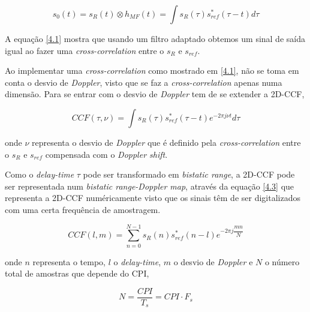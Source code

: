 \begin{equation} \label{4.1}
s_{0}\left( t\right) =s_{R}\left( t\right)\otimes h_{MF}\left( t\right) =\int s_{R}\left( \tau\right)s_{ref}^{\ast}\left(\tau -t\right)d\tau
\end{equation}

A equação \ref{4.1} mostra que usando um filtro adaptado obtemos um sinal de saída igual ao fazer uma \textit{cross-correlation} entre o $s_{R}$ e $s_{ref}$.\par 

Ao implementar uma \textit{cross-correlation} como mostrado em \ref{4.1}, não se toma em conta o desvio de \textit{Doppler}, visto que se faz a \textit{cross-correlation} apenas numa dimensão. Para se entrar com o desvio de \textit{Doppler} tem de se extender a \gls{2D-CCF},

\begin{equation} \label{4.2}
CCF\left( \tau,\nu\right) =\int s_{R}\left( \tau\right)s_{ref}^{\ast}\left(\tau -t\right)e^{-2\pi j\nu t}d\tau
\end{equation}

onde $\nu$ representa o desvio de \textit{Doppler} que é definido pela \textit{cross-correlation} entre o $s_{R}$ e $s_{ref}$ compensada com o \textit{Doppler shift}.\par
Como o \textit{delay-time} $\tau$ pode ser transformado em \textit{bistatic range}, a \gls{2D-CCF} pode ser representada num \textit{bistatic range-Doppler map}, através da equação \ref{4.3} que representa a \gls{2D-CCF} numéricamente visto que os sinais têm de ser digitalizados com uma certa frequência de amostragem.

\begin{equation} \label{4.3}
CCF\left(l,m\right) =\sum_{n=0}^{N-1} s_{R}\left( n\right)s_{ref}^{\ast}\left(n -l\right)e^{-2\pi j\dfrac{mn}{N}}
\end{equation}

onde $n$ representa o tempo, $l$ o \textit{delay-time}, $m$ o desvio de \textit{Doppler} e $N$ o número total de amostras que depende do \gls{CPI},

\begin{equation} \label{4.4}
N=\dfrac{CPI}{T_{s}}=CPI\cdot F_{s}
\end{equation}

